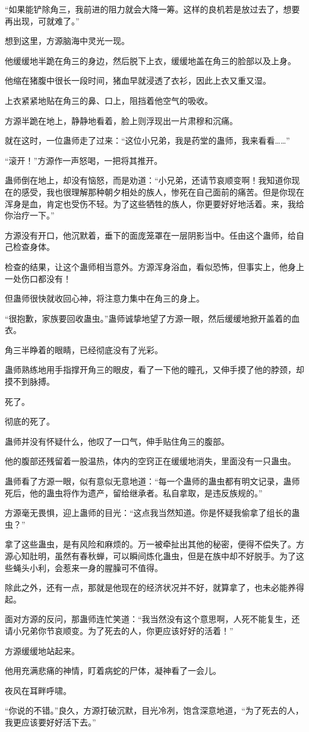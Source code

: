 \begin{this_body}
“如果能铲除角三，我前进的阻力就会大降一筹。这样的良机若是放过去了，想要再出现，可就难了。”

想到这里，方源脑海中灵光一现。

他缓缓地半跪在角三的身边，然后脱下上衣，缓缓地盖在角三的脸部以及上身。

他缩在猪腹中很长一段时间，猪血早就浸透了衣衫，因此上衣又重又湿。

上衣紧紧地贴在角三的鼻、口上，阻挡着他空气的吸收。

方源半跪在地上，静静地看着，脸上则浮现出一片肃穆和沉痛。

就在这时，一位蛊师走了过来：“这位小兄弟，我是药堂的蛊师，我来看看……”

“滚开！”方源作一声怒喝，一把将其推开。

蛊师倒在地上，却没有恼怒，而是劝道：“小兄弟，还请节哀顺变啊！我知道你现在的感受，我也很理解那种朝夕相处的族人，惨死在自己面前的痛苦。但是你现在浑身是血，肯定也受伤不轻。为了这些牺牲的族人，你更要好好地活着。来，我给你治疗一下。”

方源没有开口，他沉默着，垂下的面庞笼罩在一层阴影当中。任由这个蛊师，给自己检查身体。

检查的结果，让这个蛊师相当意外。方源浑身浴血，看似恐怖，但事实上，他身上一处伤口都没有！

但蛊师很快就收回心神，将注意力集中在角三的身上。

“很抱歉，家族要回收蛊虫。”蛊师诚挚地望了方源一眼，然后缓缓地掀开盖着的血衣。

角三半睁着的眼睛，已经彻底没有了光彩。

蛊师熟练地用手指撑开角三的眼皮，看了一下他的瞳孔，又伸手摸了他的脖颈，却摸不到脉搏。

死了。

彻底的死了。

蛊师并没有怀疑什么，他叹了一口气，伸手贴住角三的腹部。

他的腹部还残留着一股温热，体内的空窍正在缓缓地消失，里面没有一只蛊虫。

蛊师看了方源一眼，似有意似无意地道：“每一个蛊师的蛊虫都有明文记录，蛊师死后，他的蛊虫将作为遗产，留给继承者。私自拿取，是违反族规的。”

方源毫无畏惧，迎上蛊师的目光：“这点我当然知道。你是怀疑我偷拿了组长的蛊虫？”

拿了这些蛊虫，是有风险和麻烦的。万一被牵扯出其他的秘密，便得不偿失了。方源心知肚明，虽然有春秋蝉，可以瞬间炼化蛊虫，但是在族中却不好脱手。为了这些蝇头小利，会惹来一身的腥臊可不值得。

除此之外，还有一点，那就是他现在的经济状况并不好，就算拿了，也未必能养得起。

面对方源的反问，那蛊师连忙笑道：“我当然没有这个意思啊，人死不能复生，还请小兄弟你节哀顺变。为了死去的人，你更应该好好的活着！”

方源缓缓地站起来。

他用充满悲痛的神情，盯着病蛇的尸体，凝神看了一会儿。

夜风在耳畔呼啸。

“你说的不错。”良久，方源打破沉默，目光冷冽，饱含深意地道，“为了死去的人，我更应该要好好活下去。”

\end{this_body}

